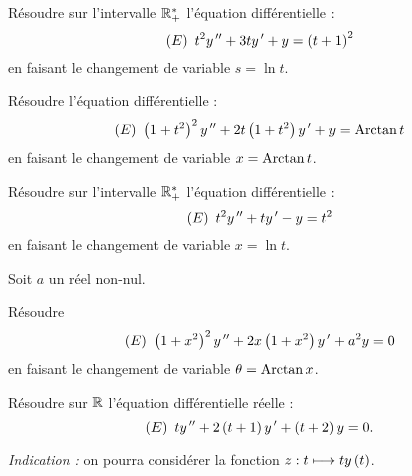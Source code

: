 \begin{corr}
\end{corr}

\begin{exo}[Exercice 10]
Résoudre sur l'intervalle \(\mathbb{R}_+^*\) l'équation différentielle : \[\left(E\right)~t^2y^{\,\prime\prime}+3ty^{\,\prime}+y=\left(t+1\right)^2\] en faisant le changement de variable \(s=\ln t\).
\end{exo}

\begin{corr}
\end{corr}

\begin{exo}[Exercice 11]
Résoudre l'équation différentielle : \[\left(E\right)~\left(1+t^2\right)^2y^{\,\prime\prime}+2t\left(1+t^2\right)y^{\,\prime}+y=\operatorname{Arctan} t\] en faisant le changement de variable \(x=\operatorname{Arctan} t\).
\end{exo}

\begin{corr}
\end{corr}

\begin{exo}[Exercice 12]
Résoudre sur l'intervalle \(\mathbb{R}_+^*\) l'équation différentielle : \[\left(E\right)~t^2y^{\,\prime\prime}+ty^{\,\prime}-y=t^2\] en faisant le changement de variable \(x=\ln t\).
\end{exo}

\begin{corr}
\end{corr}

\begin{exo}
Soit \(a\) un réel non-nul.

Résoudre \[\left(E\right)~\left(1+x^2\right)^2y^{\,\prime\prime}+2x\left(1+x^2\right)y^{\,\prime}+a^2y=0\] en faisant le changement de variable \(\theta=\operatorname{Arctan} x\).
\end{exo}

\begin{corr}
\end{corr}

\begin{exo}[Exercice 14]
Résoudre sur \(\mathbb{R}\) l'équation différentielle réelle : \[\left(E\right)~ty^{\,\prime\prime}+2\left(t+1\right)y^{\,\prime}+\left(t+2\right)y=0.\]

\textit{Indication :} on pourra considérer la fonction \(z:t\longmapsto ty\left(t\right)\).
\end{exo}

\begin{corr}
\end{corr}

